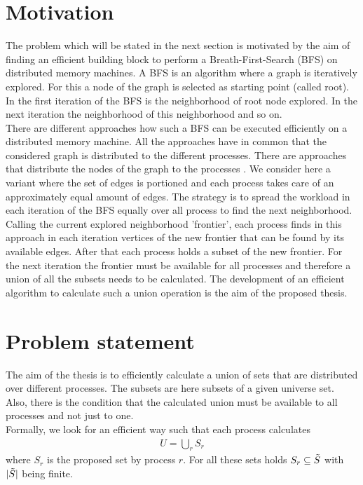\documentclass[a4paper,%
	12pt,%
	DIV14,
	headsepline,%
	headings=normal,
]{scrartcl}
\theoremstyle{definition}
\theoremstyle{remark}
\begin{document}
\section{Motivation}
The problem which will be stated in the next section is motivated by the aim of finding an efficient building block to perform a Breath-First-Search (BFS) on distributed memory machines. A BFS is an algorithm where a graph is iteratively explored. For this a node of the graph is selected as starting  point (called root). In the first iteration of the BFS is the neighborhood of root node explored. In the next iteration the neighborhood of this neighborhood and so on. \cite{standardBFS, introToAlgos}\\
There are different approaches how such a BFS can be executed efficiently on a distributed memory machine. All the approaches have in common that the considered graph is distributed to the different processes. There are approaches that distribute the nodes of the graph to the processes \cite{graphPartitioning, hybridBFS}. We consider here a variant where the set of edges is portioned and each process takes care of an approximately equal amount of edges. The strategy is to spread the workload in each iteration of the BFS equally over all process to find the next neighborhood. Calling the current explored neighborhood 'frontier', each process finds in this approach in each iteration vertices of the new frontier that can be found by its available edges. After that each process holds a subset of the new frontier. For the next iteration the frontier must be available for all processes and therefore a union of all the subsets needs to be calculated. The development of an efficient algorithm to calculate such a union operation is the aim of the proposed thesis.

\section{Problem statement}
The aim of the thesis is to efficiently calculate a union of sets that are distributed over different processes. The subsets are here subsets of a given universe set. Also, there is the condition that the calculated union must be available to all processes and not just to one.\\
Formally, we look for an efficient way such that each process calculates 
\begin{align*}
	U = \bigcup_r S_r
\end{align*}
where $S_r$ is the proposed set by process $r$. For all these sets holds $S_r\subseteq \Tilde{S}$ with $|\Tilde{S}|$ being finite.
\end{document}
